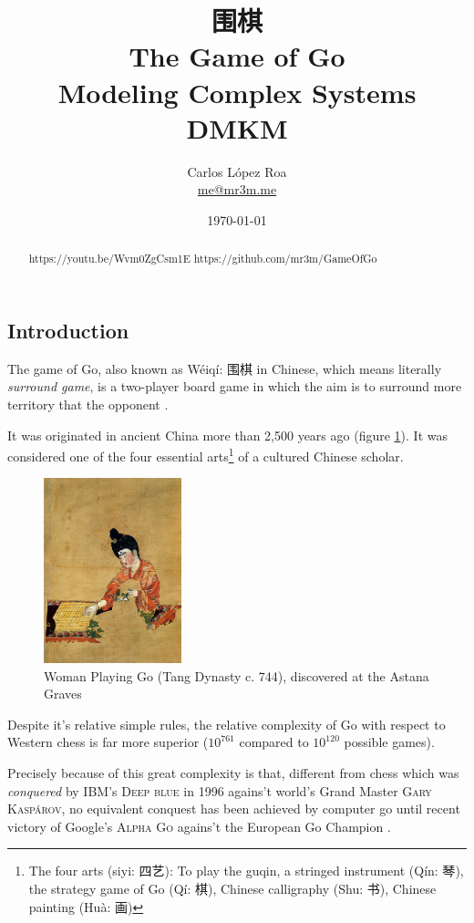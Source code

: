 \documentclass[a4paper,10pt,twocolumn]{article}
\title{围棋 \\ The Game of Go\\ \small Modeling Complex Systems\\ DMKM}
\author{Carlos López Roa\\ \href{mailto:me@mr3m.me}{me@mr3m.me}}
\date{\today}
\begin{document}
\begin{CJK*}{UTF8}{gbsn}
\maketitle
\begin{abstract}
https://youtu.be/Wvm0ZgCsm1E
https://github.com/mr3m/GameOfGo
\end{abstract}


\section{Introduction}
The game of Go, also known as {Wéiqí: 围棋} in Chinese, which means literally \emph{surround game}, is a two-player board game in which the aim is to surround more territory that the opponent \cite{Kunkle2002}.

It was originated in ancient China more than 2,500 years ago (figure \ref{l1}). It was considered one of the four essential arts\footnote{The four arts ({siyi: 四艺}): To play the guqin, a stringed instrument ({Qín:  琴}), the strategy game of Go ({Qí:  棋}), Chinese calligraphy ({Shu:  书}), Chinese painting ({Huà:  画}) } of a cultured Chinese scholar.

\begin{figure}[!ht]
\begin{center}
\includegraphics[width=4cm]{Astana.jpg}
\caption{\footnotesize{Woman Playing Go (Tang Dynasty c. 744), discovered at the Astana Graves}\label{l1}}
\end{center}
\end{figure}

Despite it's relative simple rules, the relative complexity of Go with respect to Western chess is far more superior ($10^{761}$ compared to $10^{120}$ possible games).

Precisely because of this great complexity is that, different from chess which was \emph{conquered} by IBM's \textsc{Deep blue} in 1996 agains't world's Grand Master \textsc{Gary Kaspárov}, no equivalent conquest has been achieved by computer go until recent victory of Google's \textsc{Alpha Go} agains't the European Go Champion \cite{Silver2016a}. 


\end{CJK*}
\end{document}

